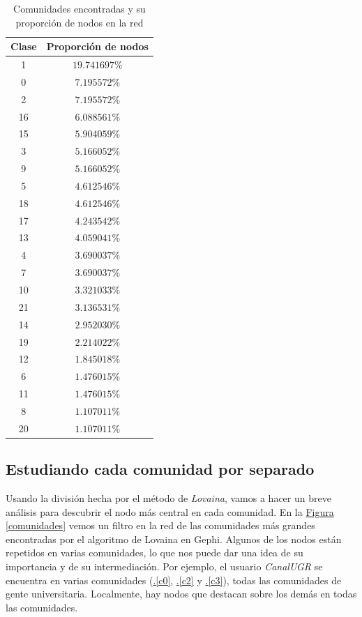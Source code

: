 \documentclass[10pt,a4paper,spanish]{article}
\numberwithin{equation}{section} %
\numberwithin{figure}{section} %
\numberwithin{table}{section} %
\begin{document}
\begin{table}[!h]
    \centering
    \begin{tabular}{c | c}
    Clase & Proporción de nodos \\
    \hline
    1   &  $19.741697\%$ \\
    0   &   $7.195572\%$ \\
    2   &   $7.195572\%$ \\
    16   &  $6.088561\%$ \\
    15   &  $5.904059\%$ \\
    3   &   $5.166052\%$ \\
    9   &   $5.166052\%$ \\
    5   &   $4.612546\%$ \\
    18   &  $4.612546\%$ \\
    17   &  $4.243542\%$ \\
    13   &  $4.059041\%$ \\
    4   &   $3.690037\%$ \\
    7   &   $3.690037\%$ \\
    10   &  $3.321033\%$ \\
    21   &  $3.136531\%$ \\
    14   &  $2.952030\%$ \\
    19   &  $2.214022\%$ \\
    12   &  $1.845018\%$ \\
    6   &   $1.476015\%$ \\
    11   &  $1.476015\%$ \\
    8   &   $1.107011\%$ \\
    20   &  $1.107011\%$ 
    \end{tabular}
    \caption{Comunidades encontradas y su proporción de nodos en la red}
    \label{comsn}
\end{table}

\subsection{Estudiando cada comunidad por separado}
Usando la división hecha por el método de \textit{Lovaina}, vamos a hacer un breve análisis para descubrir el nodo más central en cada comunidad. En la \hyperref[comunidades]{Figura \ref*{comunidades}} vemos un filtro en la red de las comunidades más grandes encontradas por el algoritmo de Lovaina en Gephi. Algunos de los nodos están repetidos en varias comunidades, lo que nos puede dar una idea de su importancia y de su intermediación. Por ejemplo, el usuario \textit{CanalUGR} se encuentra en varias comunidades (\hyperref[c0]{\thesection .\ref*{c0}}, \hyperref[c2]{\thesection .\ref*{c2}} y \hyperref[c3]{\thesection .\ref*{c3}}), todas las comunidades de gente universitaria. Localmente, hay nodos que destacan sobre los demás en todas las comunidades.
\end{document}

